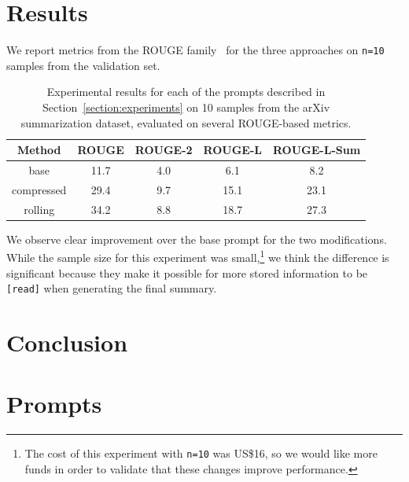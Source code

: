 \documentclass{article}
\begin{document}
\section{Results}

We report metrics from the ROUGE family~\cite{lin-hovy-2003-automatic,ganesan2015rouge} for the three approaches on \texttt{n=10} samples from the validation set.

\begin{table}[!ht]
  \centering
  \begin{tabular}{c|c|c|c|c}
    \textbf{Method} & \textbf{ROUGE} & \textbf{ROUGE-2} & \textbf{ROUGE-L} & \textbf{ROUGE-L-Sum} \\
    \hline
    base            & 11.7           & 4.0              & 6.1              & 8.2                  \\
    compressed      & 29.4           & 9.7              & 15.1             & 23.1                 \\
    rolling         & 34.2           & 8.8              & 18.7             & 27.3                 \\
  \end{tabular}
  \vspace{0.5cm}
  \caption{Experimental results for each of the prompts described in Section~\ref{section:experiments} on 10 samples from the arXiv summarization dataset, evaluated on several ROUGE-based metrics.}\label{tab:results}
\end{table}

We observe clear improvement over the base prompt for the two modifications. While the sample size for this experiment was small,\footnote{The cost of this experiment with \texttt{n=10} was US\$16, so we would like more funds in order to validate that these changes improve performance.} we think the difference is significant because they make it possible for more stored information to be \texttt{[read]} when generating the final summary.



\section{Conclusion}






\appendix

\section{Prompts}\label{section:prompts}
\end{document}
